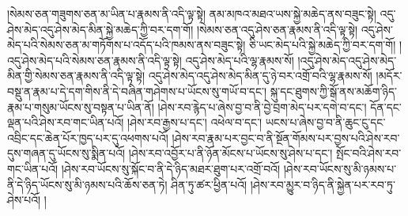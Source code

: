 །སེམས་ཅན་གཟུགས་ཅན་མ་ཡིན་པ་རྣམས་ནི་འདི་ལྟ་སྟེ། ནམ་མཁའ་མཐའ་ཡས་སྐྱེ་མཆེད་ནས་བཟུང་སྟེ། འདུ་ཤེས་མེད་འདུ་ཤེས་མེད་མིན་སྐྱེ་མཆེད་ཀྱི་བར་དག་གོ། །སེམས་ཅན་འདུ་ཤེས་ཅན་རྣམས་ནི་འདི་ལྟ་སྟེ། འདུ་ཤེས་མེད་པའི་སེམས་ཅན་མ་གཏོགས་པ་འདོད་པའི་ཁམས་ནས་བཟུང་སྟེ། ཅི་ཡང་མེད་པའི་སྐྱེ་མཆེད་ཀྱི་བར་དག་གོ། །འདུ་ཤེས་མེད་པའི་སེམས་ཅན་རྣམས་ནི་འདི་ལྟ་སྟེ། འདུ་ཤེས་མེད་པའི་ལྷ་རྣམས་སོ། །འདུ་ཤེས་མེད་འདུ་ཤེས་མེད་མིན་གྱི་སེམས་ཅན་རྣམས་ནི་འདི་ལྟ་སྟེ། འདུ་ཤེས་མེད་འདུ་ཤེས་མེད་མིན་དུ་ཉེ་བར་འགྲོ་བའི་ལྷ་རྣམས་སོ། །མདོར་བསྡུ་ན་རྣམ་པ་དེ་དག་གིས་ནི་དེ་བཞིན་གཤེགས་པ་ཡོངས་སུ་གཡོ་བ་དང་། སྐུ་དང་ཐུགས་ཀྱི་སྒོ་ནས་མཆོག་ཉིད་རྣམ་པ་གསུམ་ཡོངས་སུ་བསྟན་པ་ཡིན་ནོ། །ཤེས་རབ་རྙེད་པ་ཞེས་བྱ་བ་ནི་བྱེ་བྲག་མེད་པར་དགེ་བ་དང་། དོན་དང་ལྡན་པའི་ཤེས་རབ་གང་ཡིན་པའོ། །ཤེས་རབ་རྒྱས་པ་དང་། འཕེལ་བ་དང་། ཡངས་པ་ཞེས་བྱ་བ་ནི་ཆུང་ངུ་དང་འབྲིང་དང་ཆེན་པོར་ཁྱད་པར་དུ་འཕགས་པའོ། །ཤེས་རབ་རྣམ་པར་བྱང་བ་ནི་སྔོན་གོམས་པར་བྱས་པའི་ཤེས་རབ་དུས་གཞན་དུ་ཡོངས་སུ་སྨིན་པའོ། །ཤེས་རབ་འབྱོར་པ་ནི་ཉོན་མོངས་པ་ཡོངས་སུ་ཤེས་པ་དང་། སྤོང་བའི་ཤེས་རབ་གང་ཡིན་པའོ། །ཤེས་རབ་ཡོངས་སུ་སྐོང་བ་ནི་དེ་ཉིད་མཐར་ཐུག་པར་འགྲོ་བའོ། །ཤེས་རབ་ཡོངས་སུ་མི་ཉམས་པ་ནི་དེ་ཉིད་ཡོངས་སུ་མི་ཉམས་པའི་ཆོས་ཅན་ཏེ། ཤིན་ཏུ་ཚར་ཕྱིན་པའོ། །ཤེས་རབ་མྱུར་བ་ཉིད་ནི་སྐྱེན་པར་རབ་ཏུ་ཤེས་པའོ། །

